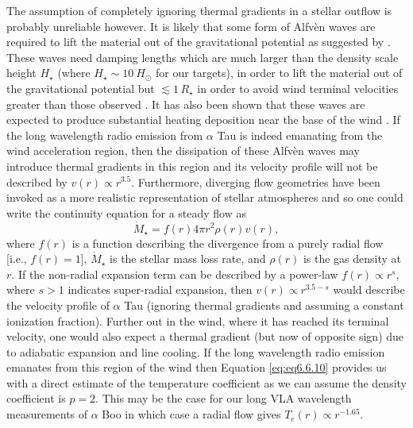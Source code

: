 The assumption of completely ignoring thermal gradients in a stellar outflow is probably unreliable however. It is likely that some form of Alfv\`{e}n waves are required to lift the material out of the gravitational potential as suggested by \cite{hartmann_1980}. These waves need damping lengths which are much larger than the density scale height $H_{\star}$ (where $H_{\star} \sim 10 \ H_{\odot}$ for our targets), in order to lift the material out of the gravitational potential but $\lesssim 1 \, R_{\star}$ in order to avoid wind terminal velocities greater than those observed \citep[e.g.][]{holzer_1983}. It has also been shown that these waves are expected to produce substantial heating deposition near the base of the wind \citep{hartmann_1982}. If the long wavelength radio emission from $\alpha$ Tau is indeed emanating from the wind acceleration region, then the dissipation of these Alfv\`{e}n waves may introduce thermal gradients in this region and its velocity profile will not be described by $v(r) \propto r^{3.5}$. Furthermore, diverging flow geometries have been invoked as a more realistic representation of stellar atmospheres \citep{hartmann_1982,jatenco_1989,vidotto_2006} and so one could write the continuity equation for a steady flow as 
\begin{equation}
\dot{M} _{\star} = f(r)4\pi r^2 \rho (r) v(r),
\end{equation}
where $f(r)$ is a function describing the divergence from a purely radial flow [i.e., $f(r)=1$], $\dot{M} _{\star}$ is the stellar mass loss rate, and $\rho(r)$ is the gas density at $r$. If the non-radial expansion term can be described by a power-law $f(r) \propto r^s$, where $s>1$ indicates super-radial expansion, then $v(r) \propto r^{3.5-s}$ would describe the velocity profile of $\alpha$ Tau (ignoring thermal gradients and assuming a constant ionization fraction). Further out in the wind, where it has reached its terminal velocity, one would also expect a thermal gradient (but now of opposite sign) due to adiabatic expansion and line cooling. If the long wavelength radio emission emanates from this region of the wind then Equation \ref{eq:eq6.6.10} provides us with a direct estimate of the temperature coefficient as we can assume the density coefficient is $p=2$. This may be the case for our long VLA wavelength measurements of $\alpha$ Boo in which case a radial flow gives $T_{e}(r) \propto r^{-1.65}$.

